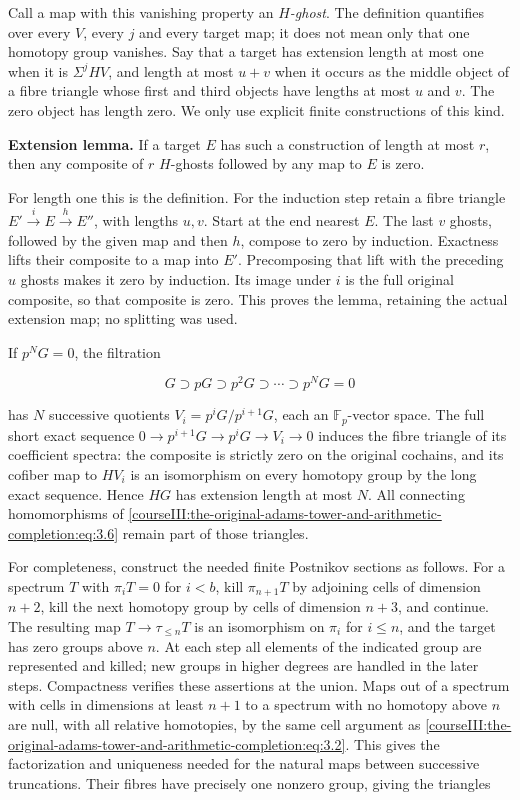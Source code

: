 Call a map with this vanishing property an \emph{\(H\)-ghost}. The definition quantifies over every \(V\), every \(j\) and every target map; it does not mean only that one homotopy group vanishes. Say that a target has extension length at most one when it is \(\Sigma^jHV\), and length at most \(u+v\) when it occurs as the middle object of a fibre triangle whose first and third objects have lengths at most \(u\) and \(v\). The zero object has length zero. We only use explicit finite constructions of this kind.

\textbf{Extension lemma.} If a target \(E\) has such a construction of length at most \(r\), then any composite of \(r\) \(H\)-ghosts followed by any map to \(E\) is zero.

For length one this is the definition. For the induction step retain a fibre triangle \(E'\xrightarrow i E\xrightarrow h E''\), with lengths \(u,v\). Start at the end nearest \(E\). The last \(v\) ghosts, followed by the given map and then \(h\), compose to zero by induction. Exactness lifts their composite to a map into \(E'\). Precomposing that lift with the preceding \(u\) ghosts makes it zero by induction. Its image under \(i\) is the full original composite, so that composite is zero. This proves the lemma, retaining the actual extension map; no splitting was used.

If \(p^NG=0\), the filtration

\begin{equation}
G\supset pG\supset p^2G\supset\cdots\supset p^NG=0
\label{courseIII:the-original-adams-tower-and-arithmetic-completion:eq:3.6}
\end{equation}

has \(N\) successive quotients \(V_i=p^iG/p^{i+1}G\), each an \(\mathbb F_p\)-vector space. The full short exact sequence
\(0\to p^{i+1}G\to p^iG\to V_i\to0\) induces the fibre triangle of its coefficient spectra: the composite is strictly zero on the original cochains, and its cofiber map to \(HV_i\) is an isomorphism on every homotopy group by the long exact sequence. Hence \(HG\) has extension length at most \(N\). All connecting homomorphisms of \eqref{courseIII:the-original-adams-tower-and-arithmetic-completion:eq:3.6} remain part of those triangles.

For completeness, construct the needed finite Postnikov sections as follows. For a spectrum \(T\) with \(\pi_iT=0\) for \(i<b\), kill \(\pi_{n+1}T\) by adjoining cells of dimension \(n+2\), kill the next homotopy group by cells of dimension \(n+3\), and continue. The resulting map \(T\to\tau_{\leq n}T\) is an isomorphism on \(\pi_i\) for \(i\leq n\), and the target has zero groups above \(n\). At each step all elements of the indicated group are represented and killed; new groups in higher degrees are handled in the later steps. Compactness verifies these assertions at the union. Maps out of a spectrum with cells in dimensions at least \(n+1\) to a spectrum with no homotopy above \(n\) are null, with all relative homotopies, by the same cell argument as \eqref{courseIII:the-original-adams-tower-and-arithmetic-completion:eq:3.2}. This gives the factorization and uniqueness needed for the natural maps between successive truncations. Their fibres have precisely one nonzero group, giving the triangles

